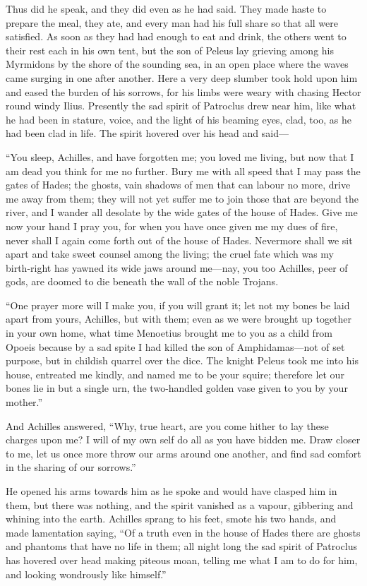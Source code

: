 Thus did he speak, and they did even as he had said. They made haste to
prepare the meal, they ate, and every man had his full share so that all
were satisfied. As soon as they had had enough to eat and drink, the
others went to their rest each in his own tent, but the son of Peleus lay
grieving among his Myrmidons by the shore of the sounding sea, in an open
place where the waves came surging in one after another. Here a very deep
slumber took hold upon him and eased the burden of his sorrows, for his
limbs were weary with chasing Hector round windy Ilius. Presently the sad
spirit of Patroclus drew near him, like what he had been in stature,
voice, and the light of his beaming eyes, clad, too, as he had been clad
in life. The spirit hovered over his head and said—

“You sleep, Achilles, and have forgotten me; you loved me living, but now
that I am dead you think for me no further. Bury me with all speed that I
may pass the gates of Hades; the ghosts, vain shadows of men that can
labour no more, drive me away from them; they will not yet suffer me to
join those that are beyond the river, and I wander all desolate by the
wide gates of the house of Hades. Give me now your hand I pray you, for
when you have once given me my dues of fire, never shall I again come
forth out of the house of Hades. Nevermore shall we sit apart and take
sweet counsel among the living; the cruel fate which was my birth-right
has yawned its wide jaws around me—nay, you too Achilles, peer of
gods, are doomed to die beneath the wall of the noble Trojans.

“One prayer more will I make you, if you will grant it; let not my bones
be laid apart from yours, Achilles, but with them; even as we were brought
up together in your own home, what time Menoetius brought me to you as a
child from Opoeis because by a sad spite I had killed the son of
Amphidamas—not of set purpose, but in childish quarrel over the
dice. The knight Peleus took me into his house, entreated me kindly, and
named me to be your squire; therefore let our bones lie in but a single
urn, the two-handled golden vase given to you by your mother.”

And Achilles answered, “Why, true heart, are you come hither to lay these
charges upon me? I will of my own self do all as you have bidden me. Draw
closer to me, let us once more throw our arms around one another, and find
sad comfort in the sharing of our sorrows.”

He opened his arms towards him as he spoke and would have clasped him in
them, but there was nothing, and the spirit vanished as a vapour,
gibbering and whining into the earth. Achilles sprang to his feet, smote
his two hands, and made lamentation saying, “Of a truth even in the house
of Hades there are ghosts and phantoms that have no life in them; all
night long the sad spirit of Patroclus has hovered over head making
piteous moan, telling me what I am to do for him, and looking wondrously
like himself.”


